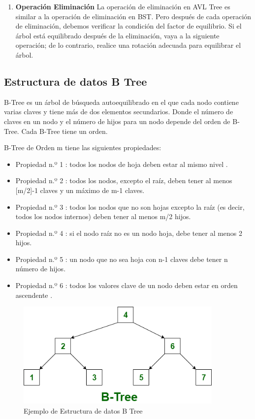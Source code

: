 \documentclass{article}
\begin{document}
\begin{enumerate}
		\item \textbf{Operación Eliminación}
				La operación de eliminación en AVL Tree es similar a la operación de eliminación en BST. Pero después de cada operación de eliminación, debemos verificar la condición del factor de equilibrio. Si el árbol está equilibrado después de la eliminación, vaya a la siguiente operación; de lo contrario, realice una rotación adecuada para equilibrar el árbol.
			\end{enumerate}
		
		

		\subsection{Estructura de datos B Tree}

B-Tree es un árbol de búsqueda autoequilibrado en el que cada nodo contiene varias claves y tiene más de dos elementos secundarios. Donde el número de claves en un nodo y el número de hijos para un nodo depende del orden de B-Tree. Cada B-Tree tiene un orden.

B-Tree de Orden m tiene las siguientes propiedades:
\begin{itemize}
   \item Propiedad n.º 1 : todos los nodos de hoja deben estar al mismo nivel .
   \item Propiedad n.º 2 : todos los nodos, excepto el raíz, deben tener al menos [m/2]-1 claves y un máximo de m-1 claves.
   \item Propiedad n.º 3 : todos los nodos que no son hojas excepto la raíz (es decir, todos los nodos internos) deben tener al menos m/2 hijos.
   \item Propiedad n.º 4 : si el nodo raíz no es un nodo hoja, debe tener al menos 2 hijos.
   \item Propiedad n.º 5 : un nodo que no sea hoja con n-1 claves debe tener n número de hijos.
   \item Propiedad n.º 6 : todos los valores clave de un nodo deben estar en orden ascendente .
\end{itemize}


\begin{figure}[H]
\centering
\includegraphics[width=0.9\textwidth]{img/B-Tree.png}
\caption{Ejemplo de Estructura de datos B Tree}
\end{figure}
\end{document}
